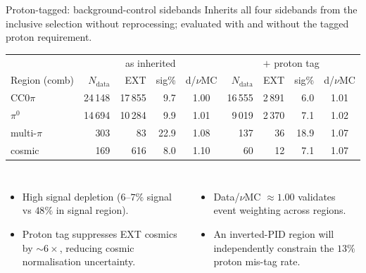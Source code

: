 \documentclass[aspectratio=169,10pt]{beamer}
\begin{document}
\begin{frame}{Proton-tagged: background-control sidebands}
  \footnotesize
  Inherits all four sidebands from the inclusive selection without reprocessing; evaluated with and without the tagged proton requirement.
  \begin{center}\scriptsize
  \begin{tabular}{lrrrc|rrrc}
  \toprule
  & \multicolumn{4}{c|}{as inherited} & \multicolumn{4}{c}{$+$ proton tag}\\
  Region (comb) & $N_\mathrm{data}$ & EXT & sig\% & d/$\nu$MC & $N_\mathrm{data}$ & EXT & sig\% & d/$\nu$MC\\\midrule
  CC$0\pi$    & 24\,148 & 17\,855 & 9.7 & 1.00 & 16\,555 & \alert{2\,891} & 6.0 & 1.01\\
  $\pi^0$     & 14\,694 & 10\,284 & 9.9 & 1.01 & 9\,019  & \alert{2\,370} & 7.1 & 1.02\\
  multi-$\pi$ & 303     & 83      & 22.9 & 1.08 & 137    & 36      & 18.9 & 1.07\\
  cosmic      & 169     & 616     & 8.0 & 1.10 & 60     & \alert{12}     & 7.1 & 1.07\\
  \bottomrule
  \end{tabular}
  \end{center}
  \begin{columns}[T]
  {\scriptsize
  \begin{itemize}\setlength\itemsep{1pt}
    \item High signal depletion ($6\text{--}7\%$ signal vs $48\%$ in signal region).
    \item Proton tag suppresses \alert{EXT cosmics by $\sim\!6\times$}, reducing cosmic normalisation uncertainty.
  \end{itemize}}
  {\scriptsize
  \begin{itemize}\setlength\itemsep{1pt}
    \item Data/$\nu$MC $\approx 1.00$ validates event weighting across regions.
    \item An inverted-PID region will independently constrain the $13\%$ proton mis-tag rate.
  \end{itemize}}
  \end{columns}
\end{frame}

\end{document}
